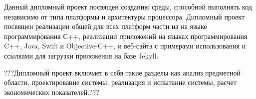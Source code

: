 Данный дипломный проект посвящен созданию среды, способной выполнять код независимо от типа платформы и архитектуры процессора.
Дипломный проект посвящен реализации общей для всех платформ части на на языке программирования С++, реализации приложений на языках программирования C++, Java, Swift и Objective-C++, и веб-сайта с примерами использования и ссылками для загрузки приложения на базе Jekyll.

???Дипломный проект включает в себя такие разделы как
анализ предметной области,
проектирование системы,
реализация и испытание системы,
расчет экономических показателей.???